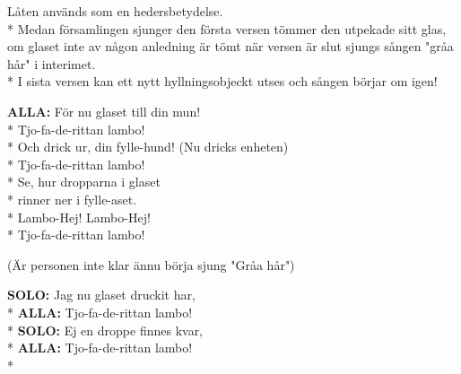 \begin{SongText}[Lambo]
    \begin{SongInfo}
        Låten används som en hedersbetydelse.\\*%
        Medan församlingen sjunger den första versen tömmer den utpekade sitt glas, om glaset inte av någon anledning är tömt när versen är slut sjungs sången "gråa hår" i interimet.\\*%
        I sista versen kan ett nytt hyllningsobjeckt utses och sången börjar om igen!
    \end{SongInfo}
    \begin{SongVerse}
        \textbf{ALLA:} För nu glaset till din mun!\\*%
        Tjo-fa-de-rittan lambo!\\*%
        Och drick ur, din fylle-hund! (Nu dricks enheten)\\*%
        Tjo-fa-de-rittan lambo!\\*%
        Se, hur dropparna i glaset \\*%
        rinner ner i fylle-aset.\\*%
        Lambo-Hej! Lambo-Hej!\\*%
        Tjo-fa-de-rittan lambo!
    \end{SongVerse}
    \begin{SongVerse}
        (Är personen inte klar ännu börja sjung "Gråa hår")
    \end{SongVerse}
    \begin{SongVerse}
        \textbf{SOLO:} Jag nu glaset druckit har,\\*%
        \textbf{ALLA:} Tjo-fa-de-rittan lambo!\\*%
        \textbf{SOLO:} Ej en droppe finnes kvar,\\*%
        \textbf{ALLA:} Tjo-fa-de-rittan lambo!\\*%

\end{SongVerse}
\end{SongText}
